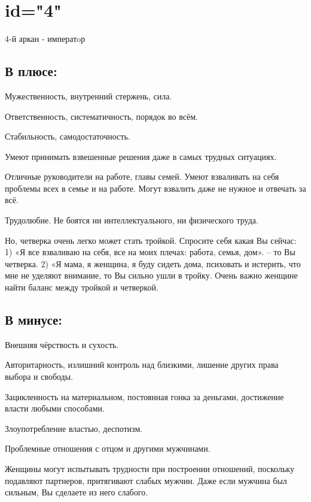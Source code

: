 \endsection

\section{id="4"}{4-й аркан - императoр}

\subsection{В плюсе:}
\item Мужественность, внутренний стержень, сила.
\item Ответственность, систематичность, порядок во всём.
\item Стабильность, самодостаточность.
\item Умеют принимать взвешенные решения даже в самых трудных ситуациях.
\item Отличные руководители на работе, главы семей.
Умеют взваливать на себя проблемы всех в семье и на работе.
Могут взвалить даже не нужное и отвечать за всё.

\item Трудолюбие. Не боятся ни интеллектуального, ни физического труда.
\item Но, четверка очень легко может стать тройкой. Спросите себя какая Вы сейчас:
1)	«Я все взваливаю на себя, все на моих плечах: работа, семья, дом». – то Вы четверка.
2)	«Я мама, я женщина, я буду сидеть дома, психовать и истерить, что мне не уделяют внимание, 
то Вы сильно ушли в тройку.
Очень важно женщине найти баланс между тройкой и четверкой. 
\endsubsection

\subsection{В минусе:}
\item Внешняя чёрствость и сухость.
\item Авторитарность, излишний контроль над близкими, лишение других права выбора и свободы.
\item Зацикленность на материальном, постоянная гонка за деньгами, достижение власти любыми способами.
\item Злоупотребление властью, деспотизм.
\item Проблемные отношения с отцом и другими мужчинами.
\item Женщины могут испытывать трудности при построении отношений, поскольку подавляют
партнеров, притягивают слабых мужчин. Даже если мужчина был сильным, Вы сделаете из него слабого.

